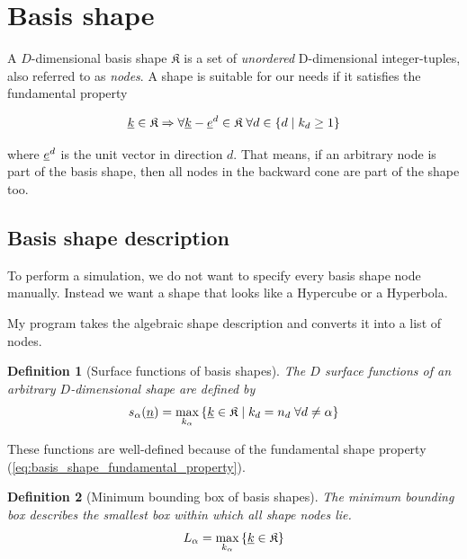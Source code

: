 \documentclass{article}
\newtheorem{definition}{Definition}
\begin{document}
\tableofcontents
\clearpage

\section{Basis shape}

A \(D\)-dimensional basis shape \(\mathfrak{K}\)
is a set of \emph{unordered} D-dimensional integer-tuples, also
referred to as \emph{nodes}.  A shape is suitable for our needs if it
satisfies the fundamental property

\begin{equation}
  \label{eq:basis_shape_fundamental_property}
  \underline{k} \in \mathfrak{K} \Rightarrow \forall
  \underline{k}-\underline{e}^d \in \mathfrak{K} \;\forall d \in \{d \;|\;k_d \geq 1\}
\end{equation}

where \(\underline{e}^d\) is the unit vector in direction \(d\).
That means, if an arbitrary node is part of the basis shape, then all nodes
in the backward cone are part of the shape too.

\subsection{Basis shape description}
To perform a simulation, we do not want to specify every basis shape node
manually. Instead we want a shape that looks like a Hypercube or a Hyperbola.

My program takes the algebraic shape description and converts it into a list of nodes.

\begin{definition}[Surface functions of basis shapes]
  The \(D\) surface functions of an arbitrary \(D\)-dimensional shape are defined by
  \begin{equation}
  s_{\alpha}(\underline{n})=\max_{k_{\alpha}}
    \left\{\underline{k} \in \mathfrak{K} \;|\;
      k_d = n_d \; \forall d \neq \alpha
    \right\}
    \label{eq:basis_shape_surface_function}
  \end{equation}
\end{definition}

These functions are well-defined because of the fundamental shape property
(\ref{eq:basis_shape_fundamental_property}).

\begin{definition}[Minimum bounding box of basis shapes]
  The minimum bounding box describes the smallest
  box within which all shape nodes lie.
  \begin{equation}
    L_{\alpha}=\max_{k_{\alpha}}\left\{\underline{k} \in \mathfrak{K}\right\}
    \label{eq:basis_shape_bbox}
  \end{equation}
\end{definition}
\end{document}
